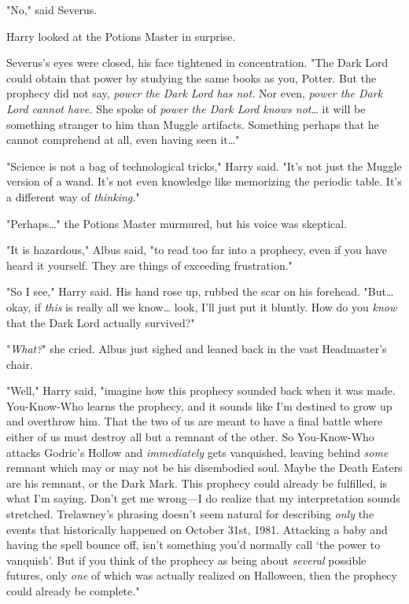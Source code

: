 "No," said Severus.

Harry looked at the Potions Master in surprise.

Severus's eyes were closed, his face tightened in concentration. "The Dark Lord
could obtain that power by studying the same books as you, Potter. But the
prophecy did not say, \emph{power the Dark Lord has not.} Nor even, \emph{power
the Dark Lord cannot have.} She spoke of \emph{power the Dark Lord knows
not}{\ldots} it will be something stranger to him than Muggle artifacts.
Something perhaps that he cannot comprehend at all, even having seen it{\ldots}"

"Science is not a bag of technological tricks," Harry said. "It's not just the
Muggle version of a wand. It's not even knowledge like memorizing the periodic
table. It's a different way of \emph{thinking.}"

"Perhaps{\ldots}" the Potions Master murmured, but his voice was skeptical.

"It is hazardous," Albus said, "to read too far into a prophecy, even if you
have heard it yourself. They are things of exceeding frustration."

"So I see," Harry said. His hand rose up, rubbed the scar on his forehead.
"But{\ldots} okay, if \emph{this} is really all we know{\ldots} look, I'll just
put it bluntly. How do you \emph{know} that the Dark Lord actually survived?"

"\emph{What?}" she cried. Albus just sighed and leaned back in the vast
Headmaster's chair.

"Well," Harry said, "imagine how this prophecy sounded back when it was made.
You-Know-Who learns the prophecy, and it sounds like I'm destined to grow up
and overthrow him. That the two of us are meant to have a final battle where
either of us must destroy all but a remnant of the other. So You-Know-Who
attacks Godric's Hollow and \emph{immediately} gets vanquished, leaving behind
\emph{some} remnant which may or may not be his disembodied soul. Maybe the
Death Eaters are his remnant, or the Dark Mark. This prophecy could already be
fulfilled, is what I'm saying. Don't get me wrong---I do realize that my
interpretation sounds stretched. Trelawney's phrasing doesn't seem natural for
describing \emph{only} the events that historically happened on October 31st,
1981. Attacking a baby and having the spell bounce off, isn't something you'd
normally call `the power to vanquish'. But if you think of the prophecy as
being about \emph{several} possible futures, only \emph{one} of which was
actually realized on Halloween, then the prophecy could already be complete."

